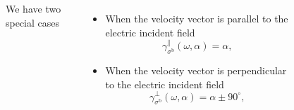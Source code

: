 \documentclass{beamer}
\begin{document}

\begin{frame}

{\small

\begin{columns}


{\Large We have two special cases}

\vspace{3mm}

\begin{itemize}

\item 
When the velocity vector is parallel to the electric incident field
\begin{equation}
\gamma_{\sigma^\mathrm{b}}^\parallel(\omega,\alpha) = \alpha, 
\label{eq:gamma-par} 
\end{equation}

\vspace{5mm}

\item 
When the velocity vector is perpendicular to the electric incident field
\begin{equation}
\gamma_{\sigma^\mathrm{b}}^\perp(\omega,\alpha) = \alpha \pm 90^{\circ},
\label{eq:gamma-perp}
\end{equation}

\end{itemize}


\vspace{-4mm}

\begin{figure}[h!]
\end{figure}
\end{columns}}
\end{frame}
\end{document}
